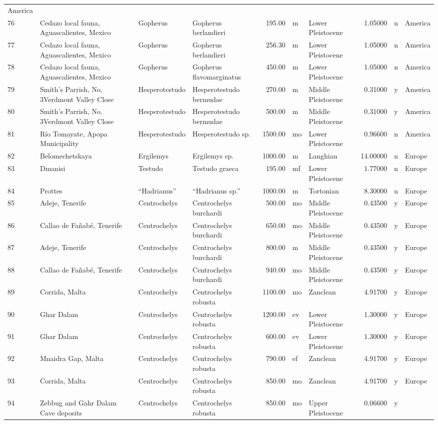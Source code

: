 \documentclass[]{article}
\begin{document}
\begin{longtable}[]{@{}llllrllrll@{}}
America\tabularnewline
76 & Cedazo local fauna, Aguascalientes, Mexico & Gopherus & Gopherus
berlandieri & 195.00 & m & Lower Pleistocene & 1.05000 & n &
America\tabularnewline
77 & Cedazo local fauna, Aguascalientes, Mexico & Gopherus & Gopherus
berlandieri & 256.30 & m & Lower Pleistocene & 1.05000 & n &
America\tabularnewline
78 & Cedazo local fauna, Aguascalientes, Mexico & Gopherus & Gopherus
flavomarginatus & 450.00 & m & Lower Pleistocene & 1.05000 & n &
America\tabularnewline
79 & Smith's Parrish, No. 3Verdmont Valley Close & Hesperotestudo &
Hesperotestudo bermudae & 270.00 & m & Middle Pleistocene & 0.31000 & y
& America\tabularnewline
80 & Smith's Parrish, No. 3Verdmont Valley Close & Hesperotestudo &
Hesperotestudo bermudae & 500.00 & m & Middle Pleistocene & 0.31000 & y
& America\tabularnewline
81 & Río Tomayate, Apopa Municipality & Hesperotestudo & Hesperotestudo
sp. & 1500.00 & mo & Lower Pleistocene & 0.96600 & n &
America\tabularnewline
82 & Belomechetskaya & Ergilemys & Ergilemys sp. & 1000.00 & m &
Langhian & 14.00000 & n & Europe\tabularnewline
83 & Dmanisi & Testudo & Testudo graeca & 195.00 & mf & Lower
Pleistocene & 1.77000 & n & Europe\tabularnewline
84 & Prottes & ``Hadrianus'' & ``Hadrianus sp.'' & 1000.00 & m &
Tortonian & 8.30000 & n & Europe\tabularnewline
85 & Adeje, Tenerife & Centrochelys & Centrochelys burchardi & 500.00 &
mo & Middle Pleistocene & 0.43500 & y & Europe\tabularnewline
86 & Callao de Fañabé, Tenerife & Centrochelys & Centrochelys burchardi
& 650.00 & mo & Middle Pleistocene & 0.43500 & y & Europe\tabularnewline
87 & Adeje, Tenerife & Centrochelys & Centrochelys burchardi & 800.00 &
m & Middle Pleistocene & 0.43500 & y & Europe\tabularnewline
88 & Callao de Fañabé, Tenerife & Centrochelys & Centrochelys burchardi
& 940.00 & mo & Middle Pleistocene & 0.43500 & y & Europe\tabularnewline
89 & Corrida, Malta & Centrochelys & Centrochelys robusta & 1100.00 & mo
& Zanclean & 4.91700 & y & Europe\tabularnewline
90 & Ghar Dalam & Centrochelys & Centrochelys robusta & 1200.00 & ev &
Lower Pleistocene & 1.30000 & y & Europe\tabularnewline
91 & Ghar Dalam & Centrochelys & Centrochelys robusta & 600.00 & ev &
Lower Pleistocene & 1.30000 & y & Europe\tabularnewline
92 & Mnaidra Gap, Malta & Centrochelys & Centrochelys robusta & 790.00 &
ef & Zanclean & 4.91700 & y & Europe\tabularnewline
93 & Corrida, Malta & Centrochelys & Centrochelys robusta & 850.00 & mo
& Zanclean & 4.91700 & y & Europe\tabularnewline
94 & Zebbug and Gahr Dalam Cave deposits & Centrochelys & Centrochelys
robusta & 850.00 & mo & Upper Pleistocene & 0.06600 & y &

\end{longtable}
\end{document}
